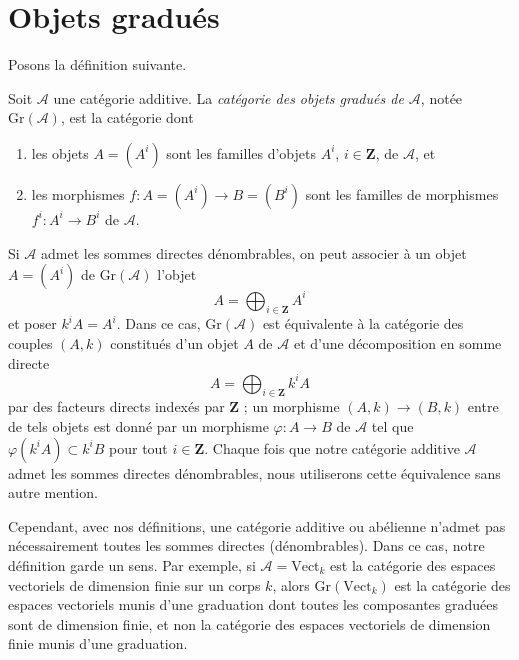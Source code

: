 

















\section{Objets gradués}
\label{section-graded}

\noindent
Posons la définition suivante.

\begin{definition}
\label{definition-graded}
Soit $\mathcal{A}$ une catégorie additive. La {\it catégorie des objets
gradués de $\mathcal{A}$}, notée $\text{Gr}(\mathcal{A})$, est
la catégorie dont
\begin{enumerate}
\item les objets $A = (A^i)$ sont les familles d'objets $A^i$, $i \in \mathbf{Z}$,
de $\mathcal{A}$, et
\item les morphismes $f : A = (A^i) \to B = (B^i)$ sont les familles de
morphismes $f^i : A^i \to B^i$ de $\mathcal{A}$.
\end{enumerate}
\end{definition}

\noindent
Si $\mathcal{A}$ admet les sommes directes dénombrables, on peut associer à
un objet $A = (A^i)$ de $\text{Gr}(\mathcal{A})$ l'objet
$$
A = \bigoplus\nolimits_{i \in \mathbf{Z}} A^i
$$
et poser $k^iA = A^i$. Dans ce cas, $\text{Gr}(\mathcal{A})$ est équivalente
à la catégorie des couples $(A, k)$ constitués d'un objet $A$ de
$\mathcal{A}$ et d'une décomposition en somme directe
$$
A = \bigoplus\nolimits_{i \in \mathbf{Z}} k^iA
$$
par des facteurs directs indexés par $\mathbf{Z}$ ; un morphisme $(A, k) \to (B, k)$
entre de tels objets est donné par un morphisme $\varphi : A \to B$ de $\mathcal{A}$
tel que $\varphi(k^iA) \subset k^iB$ pour tout $i \in \mathbf{Z}$. Chaque fois
que notre catégorie additive $\mathcal{A}$ admet les sommes directes dénombrables,
nous utiliserons cette équivalence sans autre mention.

\medskip\noindent
Cependant, avec nos définitions, une catégorie additive ou abélienne n'admet pas
nécessairement toutes les sommes directes (dénombrables). Dans ce cas, notre définition
garde un sens. Par exemple, si $\mathcal{A} = \text{Vect}_k$ est la
catégorie des espaces vectoriels de dimension finie sur un corps $k$, alors
$\text{Gr}(\text{Vect}_k)$ est la catégorie des espaces
vectoriels munis d'une graduation dont toutes les composantes graduées sont de dimension
finie, et non la catégorie des espaces vectoriels de dimension finie
munis d'une graduation.

